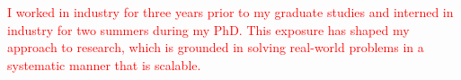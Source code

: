 \documentclass[10pt]{article}
\begin{document}
\textcolor{red}{I worked in industry for three years prior to my graduate studies and interned in industry for two summers during my PhD. This exposure has shaped my approach to research, which is grounded in solving real-world problems in a systematic manner that is scalable.}  








\end{document}
